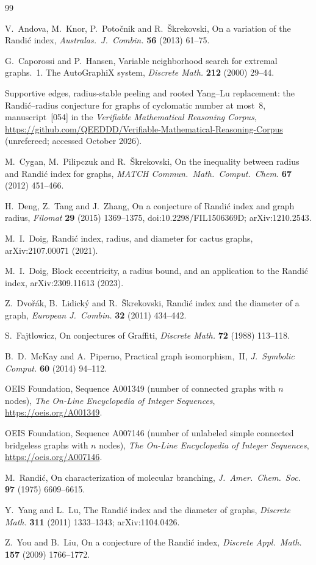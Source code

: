 \documentclass[11pt]{amsart}
\theoremstyle{definition}
\begin{document}
\begin{thebibliography}{99}

 V.~Andova, M.~Knor, P.~Poto\v{c}nik and R.~\v{S}krekovski, On a variation of the Randi\'c index,
\emph{Australas.\ J.\ Combin.} \textbf{56} (2013) 61--75.

 G.~Caporossi and P.~Hansen, Variable neighborhood search for extremal graphs.~1. The
AutoGraphiX system, \emph{Discrete Math.} \textbf{212} (2000) 29--44.

 Supportive edges, radius-stable peeling and rooted Yang--Lu replacement: the Randi\'c--radius
conjecture for graphs of cyclomatic number at most~8, manuscript~[054] in the \emph{Verifiable Mathematical Reasoning
Corpus}, \url{https://github.com/QEEDDD/Verifiable-Mathematical-Reasoning-Corpus} (unrefereed; accessed October 2026).

 M.~Cygan, M.~Pilipczuk and R.~\v{S}krekovski, On the inequality between radius and Randi\'c index for
graphs, \emph{MATCH Commun.\ Math.\ Comput.\ Chem.} \textbf{67} (2012) 451--466.

 H.~Deng, Z.~Tang and J.~Zhang, On a conjecture of Randi\'c index and graph radius, \emph{Filomat}
\textbf{29} (2015) 1369--1375, doi:10.2298/FIL1506369D; arXiv:1210.2543.

 M.~I.~Doig, Randi\'c index, radius, and diameter for cactus graphs, arXiv:2107.00071 (2021).

 M.~I.~Doig, Block eccentricity, a radius bound, and an application to the Randi\'c index,
arXiv:2309.11613 (2023).

 Z.~Dvo\v{r}\'ak, B.~Lidick\'y and R.~\v{S}krekovski, Randi\'c index and the diameter of a graph,
\emph{European J.\ Combin.} \textbf{32} (2011) 434--442.

 S.~Fajtlowicz, On conjectures of Graffiti, \emph{Discrete Math.} \textbf{72} (1988) 113--118.

 B.~D.~McKay and A.~Piperno, Practical graph isomorphism,~II, \emph{J.\ Symbolic Comput.} \textbf{60}
(2014) 94--112.

 OEIS Foundation, Sequence A001349 (number of connected graphs with $n$ nodes), \emph{The On-Line
Encyclopedia of Integer Sequences}, \url{https://oeis.org/A001349}.

 OEIS Foundation, Sequence A007146 (number of unlabeled simple connected bridgeless graphs with $n$
nodes), \emph{The On-Line Encyclopedia of Integer Sequences}, \url{https://oeis.org/A007146}.

 M.~Randi\'c, On characterization of molecular branching, \emph{J.\ Amer.\ Chem.\ Soc.} \textbf{97}
(1975) 6609--6615.

 Y.~Yang and L.~Lu, The Randi\'c index and the diameter of graphs, \emph{Discrete Math.} \textbf{311}
(2011) 1333--1343; arXiv:1104.0426.

 Z.~You and B.~Liu, On a conjecture of the Randi\'c index, \emph{Discrete Appl.\ Math.}
\textbf{157} (2009) 1766--1772.

\end{thebibliography}
\end{document}
